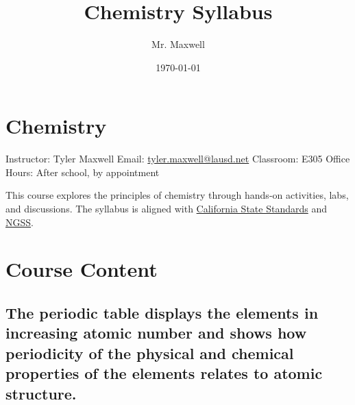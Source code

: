 \documentclass[11pt]{article}
\author{Mr. Maxwell}
\date{\today}
\title{Chemistry Syllabus}
\begin{document}
\maketitle
\tableofcontents

\section{Chemistry}
\label{sec:orgf76686c}

Instructor: Tyler Maxwell
Email: \href{mailto:tyler.maxwell@lausd.net}{tyler.maxwell@lausd.net}  
Classroom: E305  
Office Hours: After school, by appointment  


This course explores the principles of chemistry through hands-on activities, labs, and discussions. The syllabus is aligned with \href{https://www.cde.ca.gov/ci/pl/documents/ngsshsphyicalscidci.pdf}{California State Standards} and \href{https://nap.nationalacademies.org/catalog/18290/next-generation-science-standards-for-states-by-states}{NGSS}.
\section{Course Content}
\label{sec:orgc7fcb9b}

\subsection{The periodic table displays the elements in increasing atomic number and shows how periodicity of the physical and chemical properties of the elements relates to atomic structure.}
\label{sec:orgd1c971c}
\end{document}
